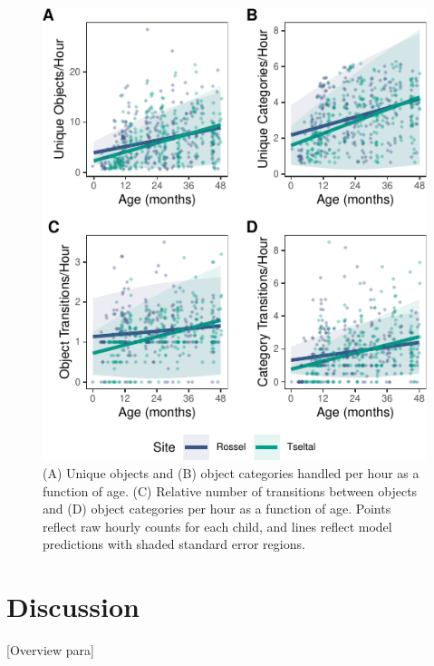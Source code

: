 \documentclass[10pt, letterpaper]{article}
\newenvironment{CodeChunk}{}{}
\begin{document}
\begin{CodeChunk}
\begin{figure}[!ht]

{\centering \includegraphics{figs/age-effects-fig-1} 

}

\caption[(A) Unique objects and (B) object categories handled per hour as a function of age]{(A) Unique objects and (B) object categories handled per hour as a function of age. (C) Relative number of transitions between objects and (D) object categories per hour as a function of age. Points reflect raw hourly counts for each child, and lines reflect model predictions with shaded standard error regions.}\label{fig:age-effects-fig}
\end{figure}
\end{CodeChunk}

\hypertarget{discussion}{%
\section{Discussion}\label{discussion}}

{[}Overview para{]}
\end{document}

